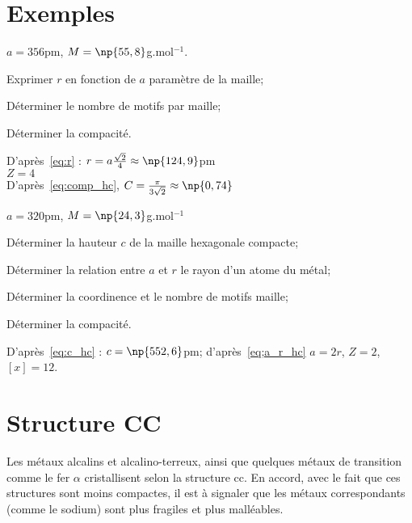 \section{Exemples}
\begin{ex}
    $a = 356$pm,
    $M = \np{55,8}$g.mol$^{-1}$.
    \begin{compactitem}
        \item Exprimer $r$ en fonction de $a$ paramètre
            de la maille;
        \item Déterminer le nombre de motifs par maille;
        \item Déterminer la compacité.
    \end{compactitem}
    D'après~\ref{eq:r} : $r = a\frac{\sqrt{2}}{4} \approx \np{124,9}$pm\\
    $Z = 4$\\
    D'après~\ref{eq:comp_hc}, $C = \frac{\pi}{3\sqrt{2}} \approx \np{0,74}$
\end{ex}
\begin{ex}
    $a = 320$pm,
    $M = \np{24,3}$g.mol$^{-1}$
    \begin{compactitem}
        \item Déterminer la hauteur $c$ de la maille hexagonale
            compacte;
        \item Déterminer la relation entre $a$ et $r$ le rayon
            d'un atome du métal;
        \item Déterminer la coordinence et le nombre de motifs
            maille;
        \item Déterminer la compacité.
    \end{compactitem}
    D'après~\ref{eq:c_hc} : $c = \np{552,6}$pm; d'après~\ref{eq;a_r_hc}
    $a = 2r$, $Z = 2$, $[x] = 12$.
\end{ex}



\section{Structure CC}
Les métaux alcalins et alcalino-terreux, ainsi que quelques
métaux de transition comme le fer $\alpha$ cristallisent selon la structure cc.
En accord, avec le fait que ces structures sont moins compactes,
il est à signaler que les métaux correspondants (comme le sodium) sont
plus fragiles et plus malléables.

